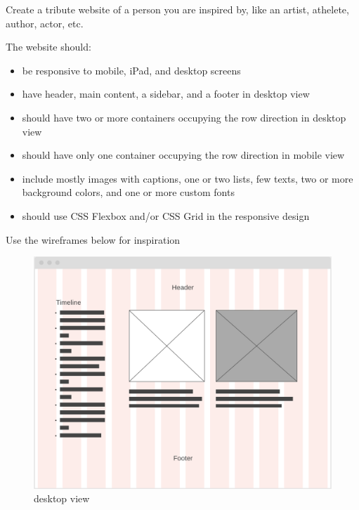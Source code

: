 \documentclass{42-en}
\begin{document}
Create a tribute website of a person you are inspired by, like an artist, athelete, author, actor, etc. \par
\vspace{.1in}
The website should:
\begin{itemize}
    \item be responsive to mobile, iPad, and desktop screens
    \item have header, main content, a sidebar, and a footer in desktop view
    \item should have two or more containers occupying the row direction in desktop view
    \item should have only one container occupying the row direction in mobile view
    \item include mostly images with captions, one or two lists, few texts, two or more background colors, and one or more custom fonts
    \item should use CSS Flexbox and/or CSS Grid in the responsive design
\end{itemize}
\vspace{.5in}
Use the wireframes below for inspiration
\begin{figure}[H]
    \begin{center}
        \includegraphics[width=12cm]{wireframe_desktop.png}\\
        desktop view
    \end{center}
\end{figure}
    
\end{document}
